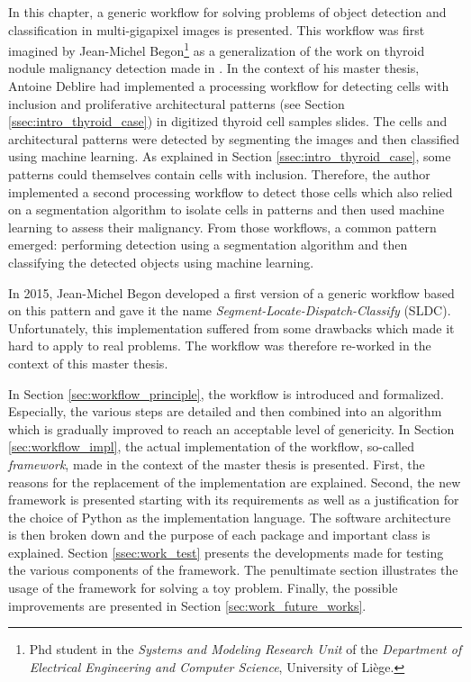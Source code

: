 \label{chap:work_intro}
In this chapter, a generic workflow for solving problems of object detection and classification in multi-gigapixel images is presented. This workflow was first imagined by Jean-Michel Begon\footnote{Phd student in the \textit{Systems and Modeling Research Unit} of the \textit{Department of Electrical Engineering and Computer Science}, University of Liège.} as a generalization of the work on thyroid nodule malignancy detection made in \cite{adeblire2013}. In the context of his master thesis, Antoine Deblire had implemented a processing workflow for detecting cells with inclusion and proliferative architectural patterns (see Section \ref{ssec:intro_thyroid_case}) in digitized thyroid cell samples slides. The cells and architectural patterns were detected by segmenting the images and then classified using machine learning. As explained in Section \ref{ssec:intro_thyroid_case}, some patterns could themselves contain cells with inclusion. Therefore, the author implemented a second processing workflow to detect those cells which also relied on a segmentation algorithm to isolate cells in patterns and then used machine learning to assess their malignancy. From those workflows, a common pattern emerged: performing detection using a segmentation algorithm and then classifying the detected objects using machine learning. 

In 2015, Jean-Michel Begon developed a first version of a generic workflow based on this pattern and gave it the name \textit{Segment-Locate-Dispatch-Classify} (SLDC). Unfortunately, this implementation suffered from some drawbacks which made it hard to apply to real problems. The workflow was therefore re-worked in the context of this master thesis. 
 
In Section \ref{sec:workflow_principle}, the workflow is introduced and formalized. Especially, the various steps are detailed and then combined into an algorithm which is gradually improved to reach an acceptable level of genericity. In Section \ref{sec:workflow_impl}, the actual implementation of the workflow, so-called \textit{framework}, made in the context of the master thesis is presented. First, the reasons for the replacement of the implementation are explained. Second, the new framework is presented starting with its requirements as well as a justification for the choice of Python as the implementation language. The software architecture is then broken down and the purpose of each package and important class is explained. Section \ref{ssec:work_test} presents the developments made for testing the various components of the framework. The penultimate section illustrates the usage of the framework for solving a toy problem. Finally, the possible improvements are presented in Section \ref{sec:work_future_works}.

